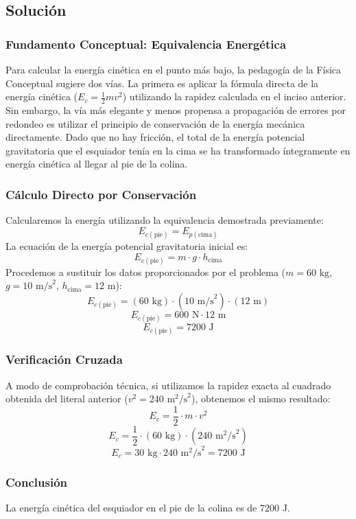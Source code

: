 \documentclass[12pt,a4paper]{article}
\begin{document}
\subsection*{Solución}

\subsubsection*{Fundamento Conceptual: Equivalencia Energética}
Para calcular la energía cinética en el punto más bajo, la pedagogía de la Física Conceptual sugiere dos vías. La primera es aplicar la fórmula directa de la energía cinética ($E_c = \frac{1}{2}mv^2$) utilizando la rapidez calculada en el inciso anterior. Sin embargo, la vía más elegante y menos propensa a propagación de errores por redondeo es utilizar el principio de conservación de la energía mecánica directamente. Dado que no hay fricción, el total de la energía potencial gravitatoria que el esquiador tenía en la cima se ha transformado íntegramente en energía cinética al llegar al pie de la colina.

\subsubsection*{Cálculo Directo por Conservación}
Calcularemos la energía utilizando la equivalencia demostrada previamente:
$$E_{c(\text{pie})} = E_{p(\text{cima})}$$
La ecuación de la energía potencial gravitatoria inicial es:
$$E_{c(\text{pie})} = m \cdot g \cdot h_{\text{cima}}$$
Procedemos a sustituir los datos proporcionados por el problema ($m = 60 \text{ kg}$, $g = 10 \text{ m/s}^2$, $h_{\text{cima}} = 12 \text{ m}$):
$$E_{c(\text{pie})} = (60 \text{ kg}) \cdot (10 \text{ m/s}^2) \cdot (12 \text{ m})$$
$$E_{c(\text{pie})} = 600 \text{ N} \cdot 12 \text{ m}$$
$$E_{c(\text{pie})} = 7200 \text{ J}$$

\subsubsection*{Verificación Cruzada}
A modo de comprobación técnica, si utilizamos la rapidez exacta al cuadrado obtenida del literal anterior ($v^2 = 240 \text{ m}^2\text{/s}^2$), obtenemos el mismo resultado:
$$E_c = \frac{1}{2} \cdot m \cdot v^2$$
$$E_c = \frac{1}{2} \cdot (60 \text{ kg}) \cdot (240 \text{ m}^2\text{/s}^2)$$
$$E_c = 30 \text{ kg} \cdot 240 \text{ m}^2\text{/s}^2 = 7200 \text{ J}$$

\subsubsection*{Conclusión}
La energía cinética del esquiador en el pie de la colina es de 7200 J.
\end{document}
